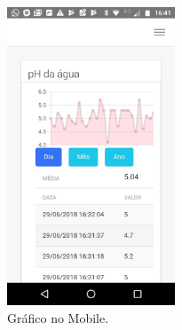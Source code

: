 	
	\begin{figure}[H]
		\centering
		\includegraphics[width=5cm]{figuras/grafMob.jpeg}
		\caption{Gráfico no Mobile.}
		\label{grafmob}
	\end{figure}
